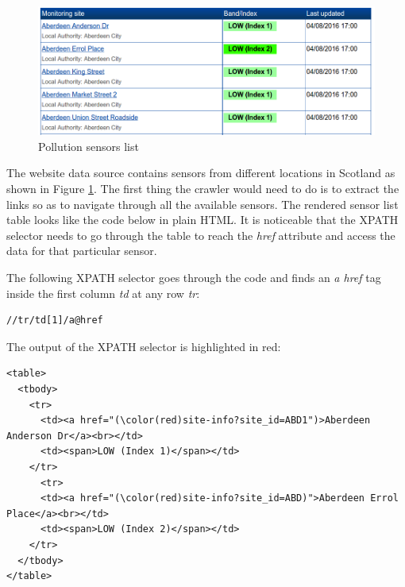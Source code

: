 \begin{figure}[H]
\begin{adjustbox}{width=.5\textwidth,center=\textwidth}
  \centering
  \includegraphics[scale=1]{images/monitoring_summary.png}
\end{adjustbox}
  \caption[Pollution sensors list]{Pollution sensors list \footnotemark}
  \label{fig:pollution_sensors_list}
\end{figure}

The website data source contains sensors from different locations in Scotland as shown in Figure \ref{fig:pollution_sensors_list}. The first thing the crawler would need to do is to extract the links so as to navigate through all the available sensors. The rendered sensor list table looks like the code below in plain HTML. It is noticeable that the XPATH selector needs to go through the table to reach the \textit{href} attribute and access the data for that particular sensor.


The following XPATH selector goes through the code and finds an \textit{a href} tag inside the first column \textit{td} at any row \textit{tr}:
\bigskip

{\centering
\begin{BVerbatim}
//tr/td[1]/a@href
\end{BVerbatim}
\par
}\bigskip

The output of the XPATH selector is highlighted in red: 

\begin{Verbatim}[fontsize=\small,commandchars=\\\(\)]
<table>
  <tbody>
    <tr>
      <td><a href="(\color(red)site-info?site_id=ABD1")>Aberdeen Anderson Dr</a><br></td>
      <td><span>LOW (Index 1)</span></td>
    </tr>
      <tr>
      <td><a href="(\color(red)site-info?site_id=ABD)">Aberdeen Errol Place</a><br></td>
      <td><span>LOW (Index 2)</span></td>
    </tr>
  </tbody>
</table>
\end{Verbatim}

